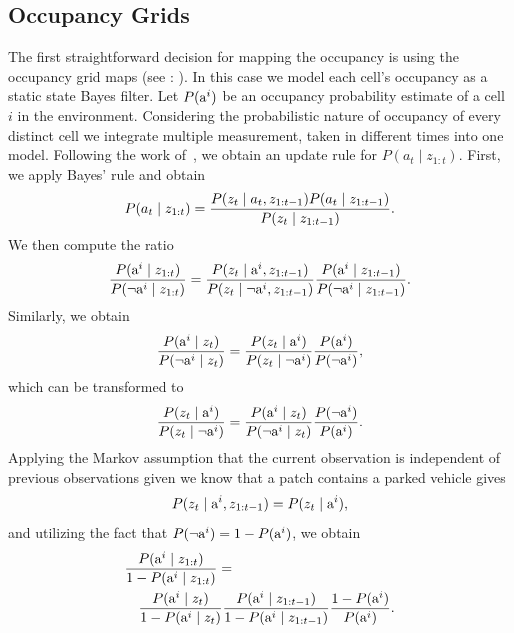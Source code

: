    \subsection{Occupancy Grids}\label{sub:occupancy_grids}
        The first straightforward decision for mapping the occupancy is using the occupancy grid maps (see : ). In this case we model each cell's occupancy as a static state Bayes filter.
        Let $P({\mbox{a}^i})$ be an occupancy probability estimate of a cell $i$ in the environment. Considering the probabilistic nature of occupancy of every distinct cell we integrate multiple measurement, taken in different times into one model. Following the work of~\cite{moravec1988}, we obtain an update rule for $P(a_t\mid z_{1:t})$. First, we apply Bayes' rule and obtain
        \begin{equation}
        P(a_t \mid  z_{1:t} ) = \frac{P(z_t \mid a_t, z_{1:t-1}) P(a_t \mid z_{1:t-1})}{P(z_t \mid z_{1:t-1})}.
        \end{equation}
        \noindent
        We then compute the ratio
        \begin{equation}
        \frac{P({\mbox{a}^i}\mid z_{1:t})}{P(\neg{\mbox{a}^i} \mid z_{1:t})}
        =
        \frac{P(z_{t} \mid {\mbox{a}^i}, z_{1:t-1})}{P(z_{t} \mid \neg{\mbox{a}^i}, z_{1:t-1})}   \frac{P({\mbox{a}^i}\mid z_{1:t-1})}{ P(\neg{\mbox{a}^i}\mid z_{1:t-1})}.
        \end{equation}
        \noindent
        Similarly, we obtain
        \begin{equation}
        \nonumber
        \frac{P({\mbox{a}^i}\mid z_{t})}{P(\neg{\mbox{a}^i} \mid z_{t})} = \frac{P(z_{t} \mid {\mbox{a}^i})}{P(z_{t} \mid \neg{\mbox{a}^i})}   \frac{P({\mbox{a}^i})}{ P(\neg{\mbox{a}^i})},
        \end{equation}
        \noindent
        which can be transformed to
        \begin{equation}
        \frac{P(z_{t} \mid {\mbox{a}^i})}{P(z_{t} \mid \neg{\mbox{a}^i})}
        =
        \frac{P({\mbox{a}^i} \mid z_{t})}{P(\neg{\mbox{a}^i} \mid z_{t})}   \frac{P(\neg{\mbox{a}^i})}{ P({\mbox{a}^i})}.
        \end{equation}
        \noindent
        Applying the Markov assumption that the current observation is
        independent of previous observations given we know that a patch
        contains a parked vehicle gives
        \begin{equation}
        P(z_{t} \mid {\mbox{a}^i}, z_{1:t-1}) = P(z_{t} \mid {\mbox{a}^i}),
        \end{equation}
        \noindent
        and utilizing the fact that $P(\neg {\mbox{a}^i}) = 1 - P({\mbox{a}^i})$, we obtain
        \begin{eqnarray}
        \lefteqn{\frac{ P(\v \mid z_{1:t}) }{ 1 - P(\v \mid z_{1:t})} = } \nonumber \\
        &&\frac{ P( \v \mid \z)}{ 1 - P(\v \mid \z)}   \frac{ P(\v \mid \y)}{ 1 - P(\v \mid  \y)}   \frac{ 1 - P(\v)}{ P(\v)}.
        \end{eqnarray}


